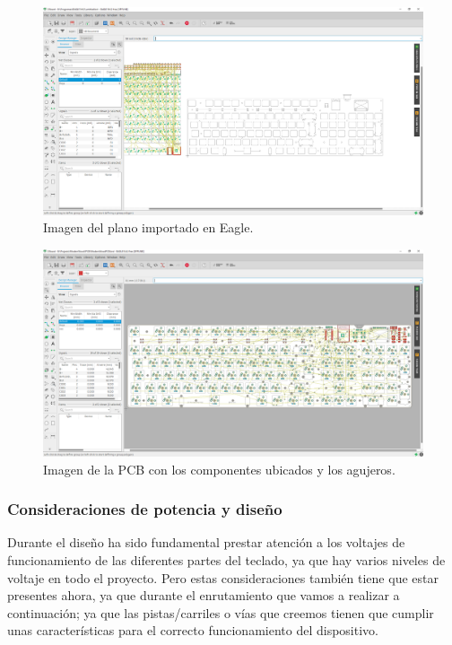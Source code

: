 \begin{figure}[H]
    \centering
    \includegraphics[width=1\textwidth]{imagenes/Capitulos/Cap05/EaglePCBPlano.png}
    \caption{Imagen del plano importado en Eagle.}
    \label{fig:EaglePCBPlano}
\end{figure}

\begin{figure}[H]
    \centering
    \includegraphics[width=1\textwidth]{imagenes/Capitulos/Cap05/EaglePCBPartesColocadas.png}
    \caption{Imagen de la \gls{PCB} con los componentes ubicados y los agujeros.}
    \label{fig:EaglePCBPartesColocadas}
\end{figure}
\newpage
\subsubsection{Consideraciones de potencia y diseño}
Durante el diseño ha sido fundamental prestar atención a los voltajes de funcionamiento de las diferentes partes del teclado, ya que hay varios niveles de voltaje en todo el proyecto. Pero estas consideraciones también tiene que estar presentes ahora, ya que durante el enrutamiento que vamos a realizar a continuación; ya que las pistas/carriles o vías que creemos tienen que cumplir unas características para el correcto funcionamiento del dispositivo.


